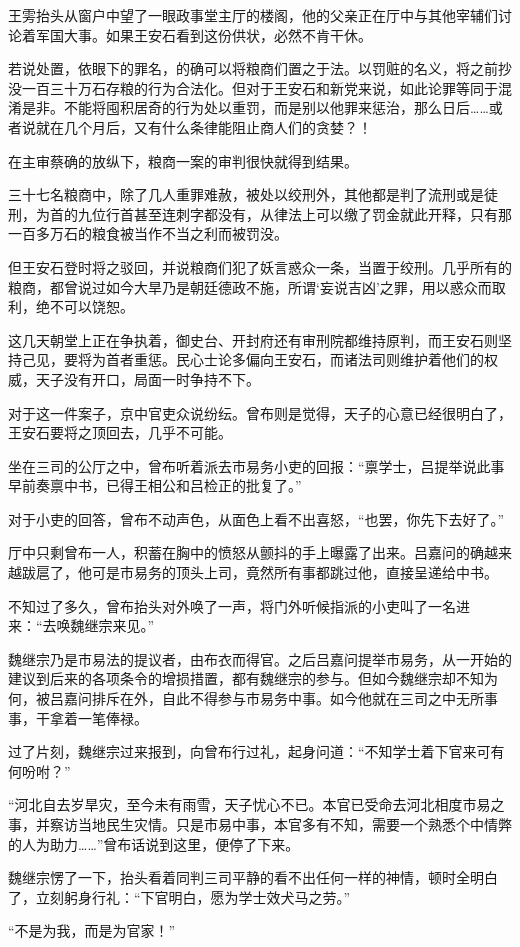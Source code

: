 王雱抬头从窗户中望了一眼政事堂主厅的楼阁，他的父亲正在厅中与其他宰辅们讨论着军国大事。如果王安石看到这份供状，必然不肯干休。

若说处置，依眼下的罪名，的确可以将粮商们置之于法。以罚赃的名义，将之前抄没一百三十万石存粮的行为合法化。但对于王安石和新党来说，如此论罪等同于混淆是非。不能将囤积居奇的行为处以重罚，而是别以他罪来惩治，那么日后……或者说就在几个月后，又有什么条律能阻止商人们的贪婪？！

在主审蔡确的放纵下，粮商一案的审判很快就得到结果。

三十七名粮商中，除了几人重罪难赦，被处以绞刑外，其他都是判了流刑或是徒刑，为首的九位行首甚至连刺字都没有，从律法上可以缴了罚金就此开释，只有那一百多万石的粮食被当作不当之利而被罚没。

但王安石登时将之驳回，并说粮商们犯了妖言惑众一条，当置于绞刑。几乎所有的粮商，都曾说过如今大旱乃是朝廷德政不施，所谓‘妄说吉凶’之罪，用以惑众而取利，绝不可以饶恕。

这几天朝堂上正在争执着，御史台、开封府还有审刑院都维持原判，而王安石则坚持己见，要将为首者重惩。民心士论多偏向王安石，而诸法司则维护着他们的权威，天子没有开口，局面一时争持不下。

对于这一件案子，京中官吏众说纷纭。曾布则是觉得，天子的心意已经很明白了，王安石要将之顶回去，几乎不可能。

坐在三司的公厅之中，曾布听着派去市易务小吏的回报：“禀学士，吕提举说此事早前奏禀中书，已得王相公和吕检正的批复了。”

对于小吏的回答，曾布不动声色，从面色上看不出喜怒，“也罢，你先下去好了。”

厅中只剩曾布一人，积蓄在胸中的愤怒从颤抖的手上曝露了出来。吕嘉问的确越来越跋扈了，他可是市易务的顶头上司，竟然所有事都跳过他，直接呈递给中书。

不知过了多久，曾布抬头对外唤了一声，将门外听候指派的小吏叫了一名进来：“去唤魏继宗来见。”

魏继宗乃是市易法的提议者，由布衣而得官。之后吕嘉问提举市易务，从一开始的建议到后来的各项条令的增损措置，都有魏继宗的参与。但如今魏继宗却不知为何，被吕嘉问排斥在外，自此不得参与市易务中事。如今他就在三司之中无所事事，干拿着一笔俸禄。

过了片刻，魏继宗过来报到，向曾布行过礼，起身问道：“不知学士着下官来可有何吩咐？”

“河北自去岁旱灾，至今未有雨雪，天子忧心不已。本官已受命去河北相度市易之事，并察访当地民生灾情。只是市易中事，本官多有不知，需要一个熟悉个中情弊的人为助力……”曾布话说到这里，便停了下来。

魏继宗愣了一下，抬头看着同判三司平静的看不出任何一样的神情，顿时全明白了，立刻躬身行礼：“下官明白，愿为学士效犬马之劳。”

“不是为我，而是为官家！”

